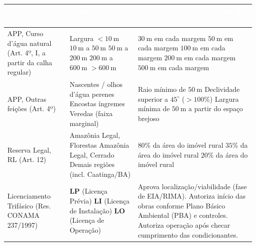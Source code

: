 \begin{center}
\renewcommand{\arraystretch}{1.22}
\small
\begin{tabularx}{\textwidth}{@{}p{4.3cm} p{4.0cm} >{\raggedright\arraybackslash}X@{}}
  \toprule
  \rowcolor{uefsForest}
  \textcolor{white}{\bfseries Categoria Legal} & \textcolor{white}{\bfseries Parâmetro Oficial} & \textcolor{white}{\bfseries Faixa / Percentual Mínimo (Lei nº 12.651/2012)} \\
  \midrule
  APP, Curso d'água natural (Art. 4º, I, a partir da calha regular) & Largura $< 10\ \text{m}$ \newline $10\ \text{m}$ a $50\ \text{m}$ \newline $50\ \text{m}$ a $200\ \text{m}$ \newline $200\ \text{m}$ a $600\ \text{m}$ \newline $> 600\ \text{m}$ & \textbf{$30\ \text{m}$} em cada margem \newline \textbf{$50\ \text{m}$} em cada margem \newline \textbf{$100\ \text{m}$} em cada margem \newline \textbf{$200\ \text{m}$} em cada margem \newline \textbf{$500\ \text{m}$} em cada margem \\
  \rowcolor{bgGray}
  APP, Outras feições (Art. 4º) & Nascentes / olhos d'água perenes \newline Encostas íngremes \newline Veredas (faixa marginal) & Raio mínimo de \textbf{$50\ \text{m}$} \newline Declividade superior a \textbf{$45^\circ$} ($> 100\%$) \newline Largura mínima de \textbf{$50\ \text{m}$} a partir do espaço brejoso \\
  Reserva Legal, RL (Art. 12) & Amazônia Legal, Florestas \newline Amazônia Legal, Cerrado \newline Demais regiões (incl. Caatinga/BA) & \textbf{$80\%$} da área do imóvel rural \newline \textbf{$35\%$} da área do imóvel rural \newline \textbf{$20\%$} da área do imóvel rural \\
  \rowcolor{bgGray}
  Licenciamento Trifásico (Res. CONAMA 237/1997) & \textbf{LP} (Licença Prévia) \newline \textbf{LI} (Licença de Instalação) \newline \textbf{LO} (Licença de Operação) & Aprova localização/viabilidade (fase de EIA/RIMA). \newline Autoriza início das obras conforme Plano Básico Ambiental (PBA) e controles. \newline Autoriza operação após checar cumprimento das condicionantes. \\
  \bottomrule
\end{tabularx}
\end{center}

